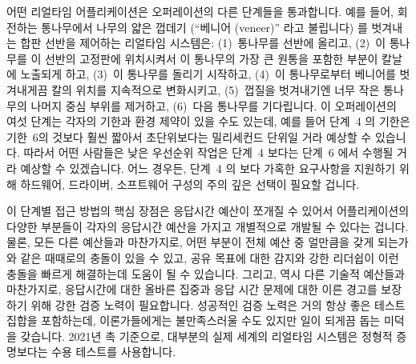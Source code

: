어떤 리얼타임 어플리케이션은 오퍼레이션의 다른 단계들을 통과합니다.
예를 들어, 회전하는 통나무에서 나무의 얇은 껍데기 (``베니어 (veneer)'' 라고
불립니다) 를 벗겨내는 합판 선반을 제어하는 리얼타임 시스템은:
(1)~통나무를 선반에 올리고,
(2)~이 통나무를 이 선반의 고정판에 위치시켜서 이 통나무의 가장 큰 원통을 포함한
부분이 칼날에 노출되게 하고,
(3)~이 통나무를 돌리기 시작하고,
(4)~이 통나무로부터 베니어를 벗겨내게끔 칼의 위치를 지속적으로 변화시키고,
(5)~껍질을 벗겨내기엔 너무 작은 통나무의 나머지 중심 부위를 제거하고,
(6)~다음 통나무를 기다립니다.
이 오퍼레이션의 여섯 단계는 각자의 기한과 환경 제약이 있을 수도 있는데, 예를
들어 단계~4 의 기한은 기한~6의 것보다 훨씬 짧아서 초단위보다는 밀리세컨드
단위일 거라 예상할 수 있습니다.
따라서 어떤 사람들은 낮은 우선순위 작업은 단계~4 보다는 단계~6 에서 수행될 거라
예상할 수 있겠습니다.
어느 경우든, 단계~4 의 보다 가혹한 요구사항을 지원하기 위해 하드웨어, 드라이버,
소프트웨어 구성의 주의 깊은 선택이 필요할 겁니다.

이 단계별 접근 방법의 핵심 장점은 응답시간 예산이 쪼개질 수 있어서
어플리케이션의 다양한 부분들이 각자의 응답시간 예산을 가지고 개별적으로 개발될
수 있다는 겁니다.
물론, 모든 다른 예산들과 마찬가지로, 어떤 부분이 전체 예산 중 얼만큼을 갖게
되는가와 같은 때때로의 충돌이 있을 수 있고, 공유 목표에 대한 감지와 강한
리더쉽이 이런 충돌을 빠르게 해결하는데 도움이 될 수 있습니다.
그리고, 역시 다른 기술적 예산들과 마찬가지로, 응답시간에 대한 올바른 집중과
응답 시간 문제에 대한 이른 경고를 보장하기 위해 강한 검증 노력이 필요합니다.
성공적인 검증 노력은 거의 항상 좋은 테스트 집합을 포함하는데, 이론가들에게는
불만족스러울 수도 있지만 일이 되게끔 돕는 미덕을 갖습니다.
2021년 촉 기준으로, 대부분의 실제 세계의 리얼타임 시스템은 정형적 증명보다는
수용 테스트를 사용합니다.

